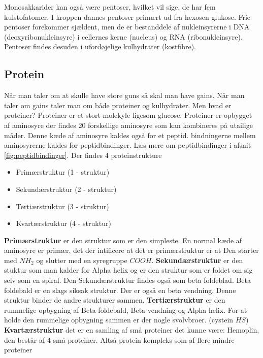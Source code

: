             Monosakkarider kan også være pentoser, hvilket vil sige, de har fem kulstofatomer. I kroppen dannes pentoser primært ud fra hexosen glukose. Frie pentoser forekommer sjældent, men de er bestanddele af nukleinsyrerne i DNA (deoxyribonukleinsyre) i cellernes kerne (nucleus) og RNA (ribonukleinsyre). Pentoser findes desuden i ufordøjelige kulhydrater (kostfibre).


        \subsection*{Protein}
            Når man taler om at skulle have store guns så skal man have gains. Når man taler om gains taler man om både proteiner og kulhydrater. Men hvad er proteiner? Proteiner er et stort molekyle ligesom glucose. Proteiner er opbygget af aminosyre der findes 20 forskellige aminosyre som kan kombineres på utailige måder. Denne kæde af aminosyre kaldes også for et peptid. bindningerne mellem aminosyrerne kaldes for peptidbindinger. Læs mere om  peptidbindinger i afsnit \ref{fig:peptidbindinger}. Der findes 4 proteinstrukture
            \begin{itemize}
                \item Primærstruktur (1 - struktur)
                \item Sekundærstruktur (2 - struktur)
                \item Tertiærstruktur (3 - struktur)
                \item Kvartærstruktur (4 - struktur)
            \end{itemize}
            \textbf{Primærstruktur} er den struktur som er den simpleste.
            En normal kæde af aminosyre er primær, det der intificere at det er primærstruktur er at Den starter med \begin{math}NH_2\end{math} og slutter med en syregruppe \begin{math}COOH\end{math}.
            \textbf{Sekundærstruktur} er den stuktur som man kalder for Alpha helix og er den struktur som er foldet om sig selv som en spiral. Den Sekundærstruktur findes også som beta foldeblad. Beta foldebald er en slags siksak struktur. Der er også en beta vendning. Denne struktur binder de andre strukturer sammen.
            \textbf{Tertiærstruktur} er den rummelige opbygning af Beta foldebald, Beta vendning og Alpha helix. For at holde den rummelige opbygning sammen er der nogle svolvbroer. (cystein \begin{math}HS\end{math})
           \textbf{Kvartærstruktur} det er en samling af små proteiner det kunne være: Hemoplin, den består af 4 små proteiner. Altså protein kompleks som af flere mindre proteiner


